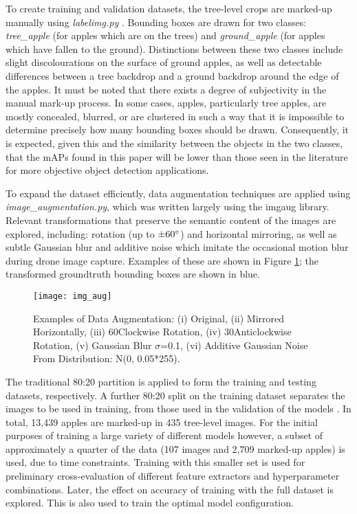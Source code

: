 \documentclass[journal]{IEEEtran}
\begin{document}
To create training and validation datasets, the tree-level crops are marked-up manually using \textit{labelimg.py} \cite{labelimg}.
Bounding boxes are drawn for two classes: \textit{tree\_apple} (for apples which are on the trees) and \textit{ground\_apple} (for apples which have fallen to the ground). Distinctions between these two classes include slight discolourations on the surface of ground apples, as well as detectable differences between a tree backdrop and a ground backdrop around the edge of the apples. It must be noted that there exists a degree of subjectivity in the manual mark-up process. In some cases, apples, particularly tree apples, are mostly concealed, blurred, or are clustered in such a way that it is impossible to determine precisely how many bounding boxes should be drawn. Consequently, it is expected, given this and the similarity between the objects in the two classes, that the mAPs found in this paper will be lower than those seen in the literature for more objective object detection applications.

To expand the dataset efficiently, data augmentation techniques are applied using \textit{image\_augmentation.py}, which was written largely using the imgaug library. Relevant transformations that preserve the semantic content of the images are explored, including: rotation (up to $\pm60\degree$) and horizontal mirroring, as well as subtle Gaussian blur and additive noise which imitate the occasional motion blur during drone image capture. Examples of these are shown in Figure \ref{fig:img_aug}; the transformed groundtruth bounding boxes are shown in blue.


\begin{figure}[H]
    \centering
    \texttt{[image: img\_aug]}
    \caption{Examples of Data Augmentation: (i) Original, (ii) Mirrored Horizontally, (iii) 60\degree Clockwise Rotation, (iv) 30\degree Anticlockwise Rotation, (v) Gaussian Blur $\sigma$=0.1, (vi) Additive Gaussian Noise From Distribution: N(0, 0.05*255). }
    \label{fig:img_aug}
\end{figure}




The traditional 80:20 partition is applied to form the training and testing datasets, respectively. A further 80:20 split on the training dataset separates the images to be used in training, from those used in the validation of the models \cite{pareto}. In total, 13,439 apples are marked-up in 435 tree-level images. 
For the initial purposes of training a large variety of different models however, a subset of approximately a quarter of the data (107 images and 2,709 marked-up apples) is used, due to time constraints. Training with this smaller set is used for preliminary cross-evaluation of different feature extractors and hyperparameter combinations. Later, the effect on accuracy of training with the full dataset is explored. This is also used to train the optimal model configuration.
\end{document}
